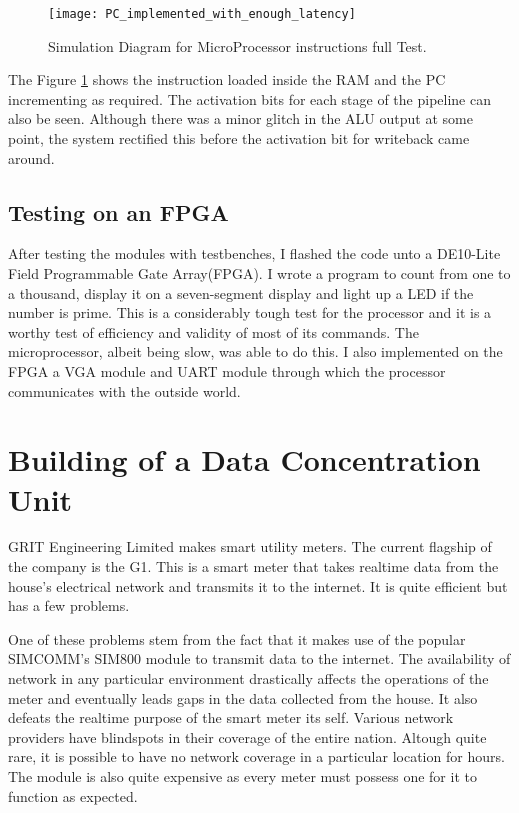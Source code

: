 \begin{figure}
    \centering
    \texttt{[image: PC\_implemented\_with\_enough\_latency]}
	\caption{Simulation Diagram for MicroProcessor instructions full Test.}
    \label{fig:sim_cpu_3}
\end{figure}

The Figure \ref{fig:sim_cpu_3} shows the instruction loaded inside the RAM and the PC incrementing as required. The activation bits for each stage of the pipeline can also be seen. Although there was a minor glitch in the ALU output at some point, the system rectified this before the activation bit for writeback came around. 

\subsection{Testing on an FPGA}
After testing the modules with testbenches, I flashed the code unto a DE10-Lite Field Programmable Gate Array(FPGA). I wrote a program to count from one to a  thousand, display it on a seven-segment display and light up a LED if the number is prime. This is a considerably tough test for the processor and it is a worthy test of efficiency and validity of most of its commands. The microprocessor, albeit being slow, was able to do this. I also implemented on the FPGA a VGA module and UART module through which the processor communicates with the outside world.




\section[DCU]{Building of a Data Concentration Unit}
GRIT Engineering Limited makes smart utility meters. The current flagship of the company is the G1. This is a smart meter that takes realtime data from the house's electrical network and transmits it to the internet. It is quite efficient but has a few problems. 

One of these problems stem from the fact that it makes use of the popular SIMCOMM's SIM800 module to transmit data to the internet. The availability of network in any particular environment drastically affects the operations of the meter and eventually leads gaps in the data collected from the house. It also defeats the realtime purpose of the smart meter its self. Various network providers have blindspots in their coverage of the entire nation. Altough quite rare, it is possible to have no network coverage in a particular location for hours. The module is also quite expensive as every meter must possess one for it to function as expected. 

